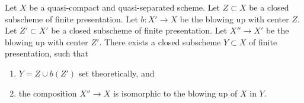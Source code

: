\begin{lemma}
\label{lemma-composition-finite-type-blowups}
Let $X$ be a quasi-compact and quasi-separated scheme.
Let $Z \subset X$ be a closed subscheme of finite presentation.
Let $b : X' \to X$ be the blowing up with center $Z$. Let $Z' \subset X'$ be
a closed subscheme of finite presentation.
Let $X'' \to X'$ be the blowing up with center $Z'$.
There exists a closed subscheme $Y \subset X$ of finite presentation,
such that
\begin{enumerate}
\item $Y = Z \cup b(Z')$ set theoretically, and
\item the composition $X'' \to X$ is isomorphic to the blowing up
of $X$ in $Y$.
\end{enumerate}
\end{lemma}

